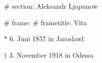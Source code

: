 # section: Aleksandr Ljapunow

# frame:
  # frametitle: Vita

  $*$ 6. Juni 1857 in Jaroslawl

  $\dagger$ 3. November 1918 in Odessa
